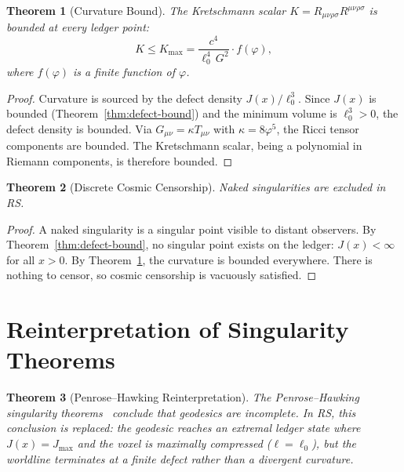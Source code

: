 \documentclass[12pt,a4paper]{article}
\newtheorem{theorem}{Theorem}[section]
\theoremstyle{definition}
\theoremstyle{remark}
\begin{document}
\begin{theorem}[Curvature Bound]
\label{thm:curvature-bound}
The Kretschmann scalar $K = R_{\mu\nu\rho\sigma}
R^{\mu\nu\rho\sigma}$ is bounded at every ledger point:
\begin{equation}
  K \leq K_{\max} = \frac{c^4}{\ell_0^4\,G^2} \cdot f(\varphi),
\end{equation}
where $f(\varphi)$ is a finite function of $\varphi$.
\end{theorem}

\begin{proof}
Curvature is sourced by the defect density $J(x)/\ell_0^3$.  Since
$J(x)$ is bounded (Theorem~\ref{thm:defect-bound}) and the minimum
volume is $\ell_0^3 > 0$, the defect density is bounded.  Via
$G_{\mu\nu} = \kappa T_{\mu\nu}$ with $\kappa = 8\varphi^5$, the
Ricci tensor components are bounded.  The Kretschmann scalar, being a
polynomial in Riemann components, is therefore bounded.
\end{proof}

\begin{theorem}[Discrete Cosmic Censorship]
\label{thm:censorship}
Naked singularities are excluded in RS.
\end{theorem}

\begin{proof}
A naked singularity is a singular point visible to distant observers.
By Theorem~\ref{thm:defect-bound}, no singular point exists on the
ledger: $J(x) < \infty$ for all $x > 0$.  By
Theorem~\ref{thm:curvature-bound}, the curvature is bounded
everywhere.  There is nothing to censor, so cosmic censorship is
vacuously satisfied.
\end{proof}

\section{Reinterpretation of Singularity Theorems}
\label{sec:reinterpretation}

\begin{theorem}[Penrose--Hawking Reinterpretation]
The Penrose--Hawking singularity theorems~\cite{Penrose1965,
Hawking1970} conclude that geodesics are incomplete.  In RS, this
conclusion is replaced: the geodesic reaches an extremal ledger state
where $J(x) = J_{\max}$ and the voxel is maximally compressed
($\ell = \ell_0$), but the worldline terminates at a finite defect
rather than a divergent curvature.
\end{theorem}
\end{document}
